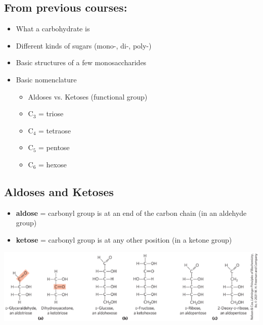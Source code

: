 \documentclass[10pt]{article}
\begin{document}
\subsection*{From previous courses:}
\begin{itemize}
    \item What a carbohydrate is
    \item Different kinds of sugars (mono-, di-, poly-)
    \item Basic structures of a few monosaccharides
    \item Basic nomenclature
    \begin{itemize}
        \item Aldoses vs. Ketoses (functional group)
        \item C$_3$ = triose
        \item C$_4$ = tetraose
        \item C$_5$ = pentose
        \item C$_6$ = hexose
    \end{itemize}
\end{itemize}

\subsection*{Aldoses and Ketoses}
\begin{itemize}
    \item \textbf{aldose} = carbonyl group is at an end of the carbon chain (in an aldehyde group)
    \item \textbf{ketose} = carbonyl group is at any other position (in a ketone group)
\end{itemize}
\begin{center}
    \includegraphics*[width=\textwidth]{L1_1.png}
\end{center}
\end{document}
